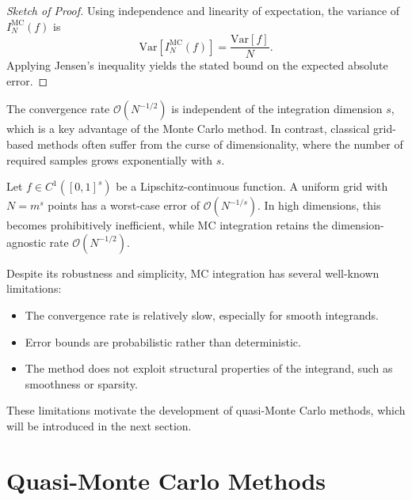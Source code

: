 \begin{proof}[Sketch of Proof]
Using independence and linearity of expectation, the variance of $I_N^{\mathrm{MC}}(f)$ is
\begin{equation}
    \mathrm{Var}[I_N^{\mathrm{MC}}(f)] = \frac{\mathrm{Var}[f]}{N}.
\end{equation}
Applying Jensen's inequality yields the stated bound on the expected absolute error.
\end{proof}

\begin{remark}
The convergence rate $\mathcal{O}(N^{-1/2})$ is independent of the integration
dimension $s$, which is a key advantage of the Monte Carlo method. In contrast,
classical grid-based methods often suffer from the curse of dimensionality,
where the number of required samples grows exponentially with $s$.
\end{remark}

\begin{example}
Let $f \in C^1([0,1]^s)$ be a Lipschitz-continuous function. A uniform grid with
$N = m^s$ points has a worst-case error of $\mathcal{O}(N^{-1/s})$. In high
dimensions, this becomes prohibitively inefficient, while MC integration retains
the dimension-agnostic rate $\mathcal{O}(N^{-1/2})$. \cite[Section
1.1]{leobacher2014introduction}
\end{example}

Despite its robustness and simplicity, MC integration has several well-known limitations:
\begin{itemize}
    \item The convergence rate is relatively slow, especially for smooth integrands.
    \item Error bounds are probabilistic rather than deterministic.
    \item The method does not exploit structural properties of the integrand, such as smoothness or sparsity.
\end{itemize}

These limitations motivate the development of quasi-Monte Carlo methods, which
will be introduced in the next section.


\section{Quasi-Monte Carlo Methods}

